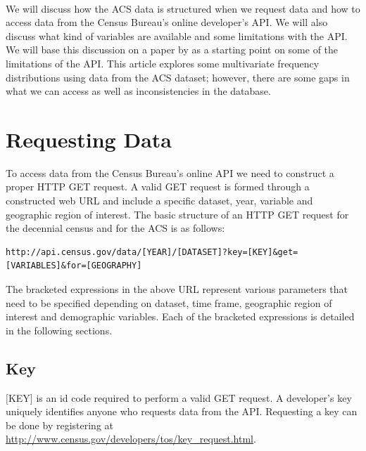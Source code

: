 \documentclass{article}\usepackage[]{graphicx}\usepackage[]{color}
\begin{document}
\\
We will discuss how the ACS data is structured when we request data and how to access data from the Census Bureau's online developer's API.  We will also discuss what kind of variables are available and some limitations with the API.  We will base this discussion on a paper by \citet{stangl:2013} as a starting point on some of the limitations of the API.  This article explores some multivariate frequency distributions using data from the ACS dataset; however, there are some gaps in what we can access as well as inconsistencies in the database.

\section{Requesting Data}
To access data from the Census Bureau's online API we need to construct a proper HTTP GET request.  A valid GET request is formed through a constructed web URL and include a specific dataset, year, variable and geographic region of interest.  The basic structure of an HTTP GET request for the decennial census and for the ACS is as follows:
\begin{verbatim}
http://api.census.gov/data/[YEAR]/[DATASET]?key=[KEY]&get=[VARIABLES]&for=[GEOGRAPHY]
\end{verbatim}
The bracketed expressions in the above URL represent various parameters that need to be specified depending on dataset, time frame, geographic region of interest and demographic variables.  Each of the bracketed expressions is detailed in the following sections.  

\subsection{Key}
$[$KEY$]$ is an id code required to perform a valid GET request.  A developer's key uniquely identifies anyone who requests data from the API.  Requesting a key can be done by registering at \url{http://www.census.gov/developers/tos/key_request.html}.
\end{document}

